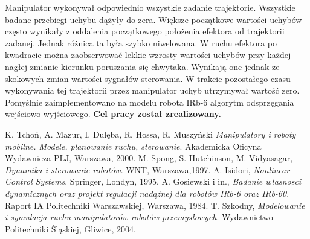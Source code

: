 \documentclass[eng,printmode]{mgr}
\begin{document}
Manipulator wykonywał odpowiednio wszystkie zadanie trajektorie. Wszystkie badane przebiegi uchybu dążyły do zera. Większe początkowe wartości uchybów często wynikały z oddalenia początkowego położenia efektora od trajektorii zadanej. Jednak różnica ta była szybko niwelowana. W ruchu efektora po kwadracie można zaobserwować lekkie wzrosty wartości uchybów przy każdej nagłej zmianie kierunku poruszania się chwytaka. Wynikają one jednak ze skokowych zmian wartości sygnałów sterowania. W trakcie pozostałego czasu wykonywania tej trajektorii przez manipulator uchyb utrzymywał wartość zero. Pomyślnie zaimplementowano na modelu robota IRb-6 algorytm odsprzęgania wejściowo-wyjściowego. \bf{Cel pracy został zrealizowany}.







\begin{thebibliography}{9}

  K. Tchoń, A. Mazur, I. Dulęba, R. Hossa, R. Muszyński
  \emph{Manipulatory i roboty mobilne. Modele, planowanie ruchu, sterowanie}.
  Akademicka Oficyna Wydawnicza PLJ, Warszawa,
  2000.
M. Spong, S. Hutchinson, M. Vidyasagar, 
\emph{Dynamika i sterowanie robotów}.
WNT, Warszawa,1997.
A. Isidori, \emph{Nonlinear Control Systems}.
Springer, Londyn, 1995.
A. Gosiewski i in., 
\emph{Badanie własnosci dynamicznych oraz projekt regulacji nadążnej dla robotów IRb-6 oraz IRb-60}.
Raport IA Politechniki Warszawskiej, Warszawa, 1984.
T. Szkodny, \emph{Modelowanie i symulacja ruchu manipulatorów robotów przemysłowych}. 
Wydawnictwo Politechniki Śląskiej, Gliwice, 2004.
\end{thebibliography}
\end{document}
